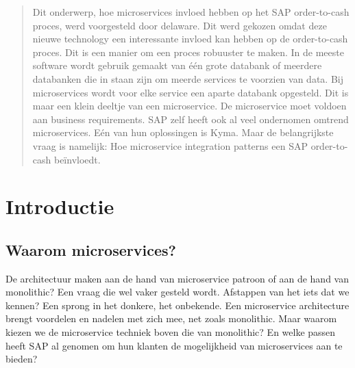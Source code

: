 \documentclass[a0,portrait]{a0poster}
\begin{document}
\begin{multicols}{2} %


\color{HoGentAccent1} %

\begin{abstract}
Dit onderwerp, hoe microservices invloed hebben op het SAP order-to-cash proces, werd voorgesteld door delaware. Dit werd gekozen omdat deze nieuwe technology een interessante invloed kan hebben op de order-to-cash proces. Dit is een manier om een proces robuuster te maken. In de meeste software wordt gebruik gemaakt van één grote databank of meerdere databanken
die in staan zijn om meerde services te voorzien van data. Bij microservices wordt voor elke service een aparte databank opgesteld. Dit is maar een klein deeltje van een microservice. De microservice moet voldoen aan business requirements. SAP zelf heeft ook al veel ondernomen omtrend microservices. Eén van hun oplossingen is Kyma. Maar de belangrijkste vraag is namelijk: Hoe microservice integration patterns een SAP order-to-cash beïnvloedt. \end{abstract}

\color{HoGentAccent1} 
\section*{Introductie}
\color{black}
\color{black}
\subsection{Waarom microservices?}
De architectuur maken aan de hand van microservice patroon of aan de hand van monolithic? Een vraag die wel vaker gesteld wordt. Afstappen van het iets dat we kennen? Een sprong in het donkere, het onbekende. Een microservice architecture brengt voordelen en nadelen met zich mee, net zoals monolithic. Maar waarom kiezen we de microservice techniek boven die van monolithic? En welke passen heeft SAP al genomen om hun klanten de mogelijkheid van microservices aan te bieden?


\end{multicols}
\end{document}
